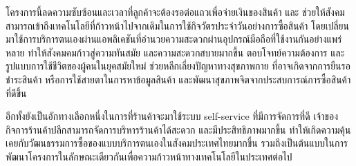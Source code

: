 \par โครงการนี้ลดความซับซ้อนและเวลาที่ลูกค้าจะต้องรอต่อแถวเพื่อจ่ายเงินของสินค้า
และ ช่วยให้สังคมสามารถเข้าถึงเทคโนโลยีที่ก้าวหน้าไปจากเดิมในการใช้กิจวัตรประจำวันอย่างการซื้อสินค้า
โดยเปลี่ยนมาใช้การบริการตนเองผ่านแอพลิเคชันที่อำนวยความสะดวกผ่านอุปกรณ์มือถือที่ใช้งานกันอย่างแพร่หลาย 
ทำให้สังคมคมก้าวสู่ความทันสมัย และความสะดวกสบายมากขึ้น ตอบโจทย์ความต้องการ และรูปแบบการใช้ชีวิตของผู้คนในยุคสมัยใหม่ 
ช่วยหลีกเลี่ยงปัญหาทางสุขภาพกาย ที่อาจเกิดจากการยืนรอชำระสินค้า หรือการใช้สายตาในการหาข้อมูลสินค้า 
และพัฒนาสุขภาพจิตจากประสบการณ์การซื้อสินค้าที่ดีขึ้น 
\par อีกทั้งยังเป็นอักทางเลือกหนึ่งในการที่ร้านค้าจะมาใช้ระบบ self-service ที่มีการจัดการที่ดี
เจ้าของกิจการร้านค้าปลีกสามารถจัดการบริหารร้านค้าได้สะดวก 
และมีประสิทธิภาพมากขึ้น ทำให้เกิดความคุ้นเคยกับวัฒนธรรมการซื้อของแบบบริการตนเองในสังคมประเทศไทยมากขึ้น 
รวมถึงเป็นต้นแบบในการพัฒนาโครงการในลักษณะเดียวกันเพื่อความก้าวหน้าทางเทคโนโลยีในประเทศต่อไป